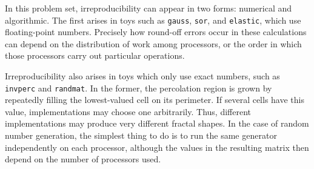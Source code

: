 In this problem set, irreproducibility can appear in two forms: numerical and algorithmic.
The first arises in toys such as {\tt{gauss}}, {\tt{sor}}, and {\tt{elastic}}, which use floating-point numbers.
Precisely how round-off errors occur in these calculations can depend on the distribution of work among processors,
or the order in which those processors carry out particular operations.

Irreproducibility also arises in toys which only use exact numbers, such as {\tt{invperc}} and {\tt{randmat}}.
In the former, the percolation region is grown by repeatedly filling the lowest-valued cell on its perimeter.
If several cells have this value, implementations may choose one arbitrarily.
Thus, different implementations may produce very different fractal shapes.
In the case of random number generation, the simplest thing to do is to run the same generator independently on each processor,
although the values in the resulting matrix then depend on the number of processors used.
